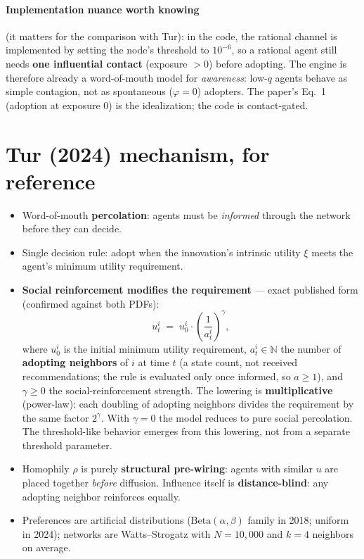 \documentclass[11pt,a4paper]{article}
\begin{document}
\paragraph{Implementation nuance worth knowing} (it matters for the comparison with Tur):
in the code, the rational channel is implemented by setting the node's threshold to
$10^{-6}$, so a rational agent still needs \textbf{one influential contact} (exposure
$>0$) before adopting. The engine is therefore already a word-of-mouth model for
\emph{awareness}: low-$q$ agents behave as simple contagion, not as spontaneous
($\varphi = 0$) adopters. The paper's Eq.~1 (adoption at exposure $0$) is the
idealization; the code is contact-gated.

\section{Tur (2024) mechanism, for reference}
\label{sec:tur}

\begin{itemize}
  \item Word-of-mouth \textbf{percolation}: agents must be \emph{informed} through the
    network before they can decide.
  \item Single decision rule: adopt when the innovation's intrinsic utility $\xi$ meets
    the agent's minimum utility requirement.
  \item \textbf{Social reinforcement modifies the requirement} --- exact published form
    (confirmed against both PDFs):
\begin{equation}
  u_t^i \;=\; u_0^i \cdot \left(\frac{1}{a_t^i}\right)^{\gamma},
  \label{eq:turform}
\end{equation}
    where $u_0^i$ is the initial minimum utility requirement, $a_t^i \in \mathbb{N}$ the
    number of \textbf{adopting neighbors} of $i$ at time $t$ (a state count, not received
    recommendations; the rule is evaluated only once informed, so $a \ge 1$), and
    $\gamma \ge 0$ the social-reinforcement strength. The lowering is
    \textbf{multiplicative} (power-law): each doubling of adopting neighbors divides the
    requirement by the same factor $2^{\gamma}$. With $\gamma = 0$ the model reduces to
    pure social percolation. The threshold-like behavior emerges from this lowering, not
    from a separate threshold parameter.
  \item Homophily $\rho$ is purely \textbf{structural pre-wiring}: agents with similar
    $u$ are placed together \emph{before} diffusion. Influence itself is
    \textbf{distance-blind}: any adopting neighbor reinforces equally.
  \item Preferences are artificial distributions ($\mathrm{Beta}(\alpha,\beta)$ family in
    2018; uniform in 2024); networks are Watts--Strogatz with $N = 10{,}000$ and
    $k = 4$ neighbors on average.
\end{itemize}
\end{document}
